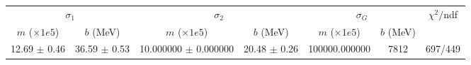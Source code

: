 \begin{tabular}{cc|cc|cc||c}
\multicolumn{2}{c|}{$\sigma_1$} & \multicolumn{2}{|c}{$\sigma_2$} & \multicolumn{2}{|c}{$\sigma_G$}  & \multirow{2}{*}{$\chi^2/$ndf}\\
$m$ ($\times1e5$) & $b$ (MeV) & $m$ ($\times1e5$) & $b$ (MeV) & $m$ ($\times1e5$) & $b$ (MeV) & \\
\hline
12.69 $\pm$ 0.46 & 36.59 $\pm$ 0.53 & 10.000000 $\pm$ 0.000000 & 20.48 $\pm$ 0.26 & 100000.000000 & 7812 & 697/449\\
\end{tabular}
